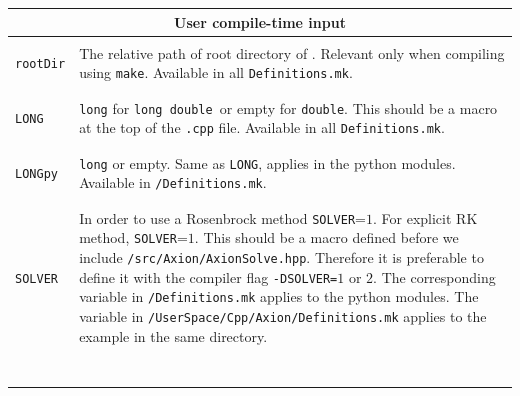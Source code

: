 \documentclass[11pt,a4paper]{article}
\begin{document}
\begin{table}[h!]
	\centering
	\begin{tabular}{l l}
		\multicolumn{2}{c}{\bf User compile-time input}  \\
		\hline\\[-0.4cm]

		{\tt rootDir}& \multirow{1}{12cm}{The relative path of root directory of \mimes. Relevant only when compiling using {\tt make}. Available in all {\tt Definitions.mk}.}\\\\		
		\hline\\[-0.4cm]
		
		{\tt LONG}& \multirow{1}{12cm}{{\tt long} for {\tt long double }or empty for {\tt double}. This should be a macro at the top of the {\tt .cpp} file. Available in all {\tt Definitions.mk}.}\\\\		
		\hline\\[-0.4cm]

		{\tt LONGpy}& \multirow{1}{12cm}{{\tt long} or empty. Same as {\tt LONG}, applies in the python modules. Available in {\tt \mimes/Definitions.mk}.}\\\\		
		\hline\\[-0.4cm]

		{\tt SOLVER}& \multirow{1}{12cm}{In order to use a Rosenbrock method {\tt SOLVER}=$1$. For explicit RK method, {\tt SOLVER}=$1$. 
		This should be a macro defined before we include {\tt \mimes/src/Axion/AxionSolve.hpp}. Therefore it is preferable to 
		define it with the compiler flag {\tt -DSOLVER=}$1$ or $2$. The corresponding variable in {\tt \mimes/Definitions.mk} applies to the python modules. The variable in {\tt \mimes/UserSpace/Cpp/Axion/Definitions.mk} applies to the example in the same directory.}\\\\\\\\\\\\\\		
		\hline\\[-0.4cm]


\end{tabular}
\end{table}
\end{document}
